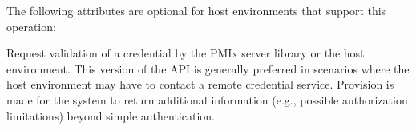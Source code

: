 
\reqattrend

\optattrstart
The following attributes are optional for host environments that support this operation:


\optattrend

\descr

Request validation of a credential by the \ac{PMIx} server library or the host environment. This version of the \ac{API} is generally preferred in scenarios where the host environment may have to contact a remote credential service. Provision is made for the system to return additional information (e.g., possible authorization limitations) beyond simple authentication.

